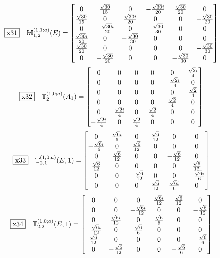 \documentclass[fleqn,10pt,landscape]{jsarticle}
\begin{document}
\begin{dmath*}
\fbox{x31}\quad \mathbb{M}_{1,2}^{(1,1;a)}(E)=\begin{bmatrix} 0 & \frac{\sqrt{30}}{15} & 0 & - \frac{\sqrt{30} i}{20} & \frac{\sqrt{30}}{20} & 0 \\ \frac{\sqrt{30}}{15} & 0 & \frac{\sqrt{30} i}{20} & 0 & 0 & - \frac{\sqrt{30}}{20} \\ 0 & - \frac{\sqrt{30} i}{20} & 0 & - \frac{\sqrt{30}}{30} & 0 & 0 \\ \frac{\sqrt{30} i}{20} & 0 & - \frac{\sqrt{30}}{30} & 0 & 0 & 0 \\ \frac{\sqrt{30}}{20} & 0 & 0 & 0 & 0 & - \frac{\sqrt{30}}{30} \\ 0 & - \frac{\sqrt{30}}{20} & 0 & 0 & - \frac{\sqrt{30}}{30} & 0 \end{bmatrix}
\end{dmath*}
\begin{dmath*}
\fbox{x32}\quad \mathbb{T}_{2}^{(1,0;a)}(A_{1})=\begin{bmatrix} 0 & 0 & 0 & 0 & 0 & \frac{\sqrt{2} i}{4} \\ 0 & 0 & 0 & 0 & - \frac{\sqrt{2} i}{4} & 0 \\ 0 & 0 & 0 & 0 & 0 & \frac{\sqrt{2}}{4} \\ 0 & 0 & 0 & 0 & \frac{\sqrt{2}}{4} & 0 \\ 0 & \frac{\sqrt{2} i}{4} & 0 & \frac{\sqrt{2}}{4} & 0 & 0 \\ - \frac{\sqrt{2} i}{4} & 0 & \frac{\sqrt{2}}{4} & 0 & 0 & 0 \end{bmatrix}
\end{dmath*}
\begin{dmath*}
\fbox{x33}\quad \mathbb{T}_{2,1}^{(1,0;a)}(E,1)=\begin{bmatrix} 0 & \frac{\sqrt{6} i}{6} & 0 & \frac{\sqrt{6}}{12} & 0 & 0 \\ - \frac{\sqrt{6} i}{6} & 0 & \frac{\sqrt{6}}{12} & 0 & 0 & 0 \\ 0 & \frac{\sqrt{6}}{12} & 0 & 0 & - \frac{\sqrt{6}}{12} & 0 \\ \frac{\sqrt{6}}{12} & 0 & 0 & 0 & 0 & \frac{\sqrt{6}}{12} \\ 0 & 0 & - \frac{\sqrt{6}}{12} & 0 & 0 & - \frac{\sqrt{6} i}{6} \\ 0 & 0 & 0 & \frac{\sqrt{6}}{12} & \frac{\sqrt{6} i}{6} & 0 \end{bmatrix}
\end{dmath*}
\begin{dmath*}
\fbox{x34}\quad \mathbb{T}_{2,2}^{(1,0;a)}(E,1)=\begin{bmatrix} 0 & 0 & 0 & \frac{\sqrt{6} i}{12} & \frac{\sqrt{6}}{12} & 0 \\ 0 & 0 & - \frac{\sqrt{6} i}{12} & 0 & 0 & - \frac{\sqrt{6}}{12} \\ 0 & \frac{\sqrt{6} i}{12} & 0 & \frac{\sqrt{6}}{6} & 0 & 0 \\ - \frac{\sqrt{6} i}{12} & 0 & \frac{\sqrt{6}}{6} & 0 & 0 & 0 \\ \frac{\sqrt{6}}{12} & 0 & 0 & 0 & 0 & - \frac{\sqrt{6}}{6} \\ 0 & - \frac{\sqrt{6}}{12} & 0 & 0 & - \frac{\sqrt{6}}{6} & 0 \end{bmatrix}
\end{dmath*}
\end{document}
